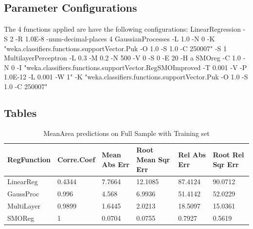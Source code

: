 \documentclass[runningheads]{llncs}
\begin{document}
\subsection{Parameter Configurations}
\paragraph{}
The 4 functions applied are have the following configurations:\break
LinearRegression -S 2 -R 1.0E-8 -num-decimal-places 4\hfill\break{}
GaussianProcesses -L 1.0 -N 0 -K "weka.classifiers.functions.supportVector.Puk -O 1.0 -S 1.0 -C 250007" -S 1\hfill\break{}
MultilayerPerceptron -L 0.3 -M 0.2 -N 500 -V 0 -S 0 -E 20 -H a\hfill\break{}
SMOreg -C 1.0 -N 0 -I "weka.classifiers.functions.supportVector.RegSMOImproved -T 0.001 -V -P 1.0E-12 -L 0.001 -W 1" -K "weka.classifiers.functions.supportVector.Puk -O 1.0 -S 1.0 -C 250007"\hfill\break{}

\subsection{Tables}

\begin{table}[H]
\caption{MeanArea predictions on Full Sample with Training set}\label{tab1}
\begin{tabular}{|l|l|l|l|l|l|}
\hline
RegFunction & Corre.\break Coef & Mean Abs Err & Root Mean Sqr Err & Rel Abs Err &Root Rel Sqr Err\\
\hline
LinearReg & 0.4344 & 7.7664 & 12.1085 & 87.4124 & 90.0712  \\
GaussProc & 0.996 & 4.568 & 6.9936 & 51.4142 & 52.0229 \\
MultiLayer & 0.9899 & 1.6445 & 2.0213 & 18.5097 & 15.0361 \\
SMOReg & 1 & 0.0704 & 0.0755 &  0.7927 & 0.5619 \\
\hline
\end{tabular}
\end{table}
\end{document}
